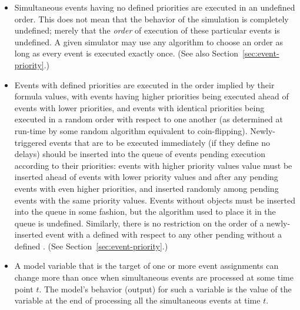 \begin{itemize}
\item Simultaneous events having no defined priorities are
  executed in an undefined order.  This does not mean that the
  behavior of the simulation is completely undefined; merely that
  the \emph{order} of execution of these particular events is
  undefined.  A given simulator may use any algorithm to choose an
  order as long as every event is executed exactly once.  (See
  also Section~\ref{sec:event-priority}.)

\item Events with defined priorities are executed in the order
  implied by their \Priority {} formula values, with
  events having higher priorities being executed ahead of events
  with lower priorities, and events with identical priorities
  being executed in a random order with respect to one another (as
  determined at run-time by some random algorithm equivalent to
  coin-flipping).  Newly-triggered events that are to be executed
  immediately (\ie if they define no delays) should be inserted
  into the queue of events pending execution according to their
  priorities: events with higher priority values value must be
  inserted ahead of events with lower priority values and after
  any pending events with even higher priorities, and inserted
  randomly among pending events with the same priority values.
  Events without \Priority objects must be inserted into the queue
  in some fashion, but the algorithm used to place it in the queue
  is undefined.  Similarly, there is no restriction on the order
  of a newly-inserted event with a defined \Priority with respect
  to any other pending \Event without a defined \Priority.  (See
  Section~\ref{sec:event-priority}.)

% 

\item A model variable that is the target of one or more event
  assignments can change more than once when simultaneous events
  are processed at some time point $t$.  The model's behavior
  (output) for such a variable is the value of the variable at the
  end of processing all the simultaneous events at time $t$.

\end{itemize}


